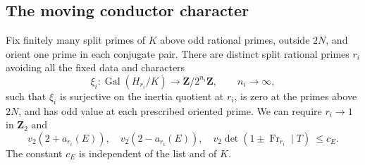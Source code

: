 \subsection{The moving conductor character}

\begin{proposition}\label{rl:characters}
Fix finitely many split primes of $K$ above odd rational primes, outside
$2N$, and orient one prime in each conjugate pair.  There are distinct
split rational primes $r_i$ avoiding all the fixed data and characters
\[
 \xi_i:\operatorname{Gal}(H_{r_i}/K)\longrightarrow
                 \mathbf Z/2^{n_i}\mathbf Z,
 \qquad n_i\longrightarrow\infty,
\]
such that $\xi_i$ is surjective on the inertia quotient at $r_i$, is zero
at the primes above $2N$, and has odd value at each prescribed oriented
prime.  We can require $r_i\to1$ in $\mathbf Z_2$ and
\begin{equation}\label{rl:trace-bound}
 v_2(2+a_{r_i}(E)),\quad v_2(2-a_{r_i}(E)),\quad
 v_2\det(1\pm\operatorname{Fr}_{r_i}\mid T)\ \leq c_E.
\end{equation}
The constant $c_E$ is independent of the list and of $K$.
\end{proposition}

